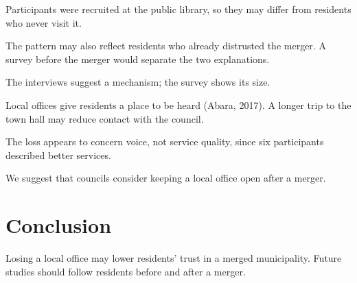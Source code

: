 Participants were recruited at the public library, so they may differ from residents who never visit it.

The pattern may also reflect residents who already distrusted the merger. A survey before the merger would separate the two explanations.

The interviews suggest a mechanism; the survey shows its size.

Local offices give residents a place to be heard (Abara, 2017). A longer trip to the town hall may reduce contact with the council.

The loss appears to concern voice, not service quality, since six participants described better services.

We suggest that councils consider keeping a local office open after a merger.

\section{Conclusion}

Losing a local office may lower residents' trust in a merged municipality. Future studies should follow residents before and after a merger.
